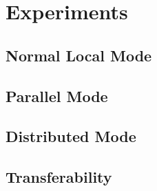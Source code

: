 
\chapter{Experiments}\label{chapter:experiments}

\section{Normal Local Mode}

\section{Parallel Mode}

\section{Distributed Mode}

\section{Transferability}


